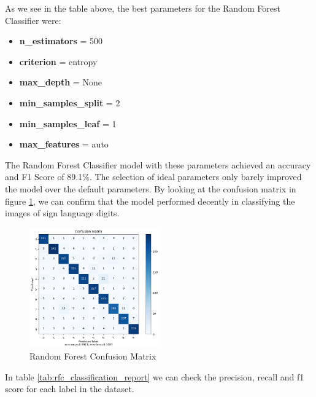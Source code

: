 \documentclass[conference]{IEEEtran}
\begin{document}
As we see in the table above, the best parameters for the Random Forest Classifier were:

\begin{itemize}
    \item \textbf{n\_estimators} = 500
    \item \textbf{criterion} = entropy
    \item \textbf{max\_depth} = None
    \item \textbf{min\_samples\_split} = 2
    \item \textbf{min\_samples\_leaf} = 1
    \item \textbf{max\_features} = auto
\end{itemize}

 The Random Forest Classifier model with these parameters achieved an accuracy and F1 Score of 89.1\%. The selection of ideal parameters only barely improved the model over the default parameters.
By looking at the confusion matrix in figure \ref{fig:rf_confusion_matrix}, we can confirm that the model performed decently in classifying the images of sign language digits.
\begin{figure}[!h]
    \centering
    \includegraphics[width=0.5\textwidth]{assets/rfc-confusion-matrix.png}
    \caption{Random Forest Confusion Matrix}
    \label{fig:rf_confusion_matrix}
\end{figure}

In table \ref{tab:rfc_classification_report} we can check the precision, recall and f1 score for each label in the dataset.
\end{document}
